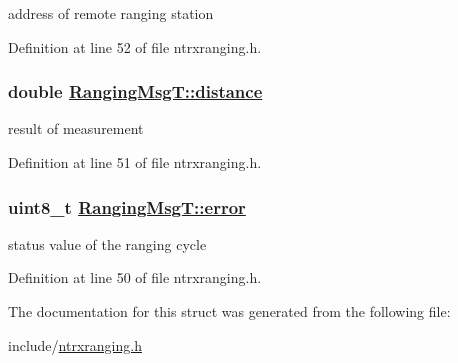 address of remote ranging station 

Definition at line 52 of file ntrxranging.h.\hypertarget{structRangingMsgT_b10eb73f4f5092f27dd38215cc59a748}{
\subsubsection[distance]{\setlength{\rightskip}{0pt plus 5cm}double \hyperlink{structRangingMsgT_b10eb73f4f5092f27dd38215cc59a748}{Ranging\-Msg\-T::distance}}}
\label{structRangingMsgT_b10eb73f4f5092f27dd38215cc59a748}


result of measurement 

Definition at line 51 of file ntrxranging.h.\hypertarget{structRangingMsgT_a90c066386e8e1ac2a4a08f88c958d68}{
\subsubsection[error]{\setlength{\rightskip}{0pt plus 5cm}uint8\_\-t \hyperlink{structRangingMsgT_a90c066386e8e1ac2a4a08f88c958d68}{Ranging\-Msg\-T::error}}}
\label{structRangingMsgT_a90c066386e8e1ac2a4a08f88c958d68}


status value of the ranging cycle 

Definition at line 50 of file ntrxranging.h.

The documentation for this struct was generated from the following file:\begin{CompactItemize}
\item 
include/\hyperlink{ntrxranging_8h}{ntrxranging.h}\end{CompactItemize}
